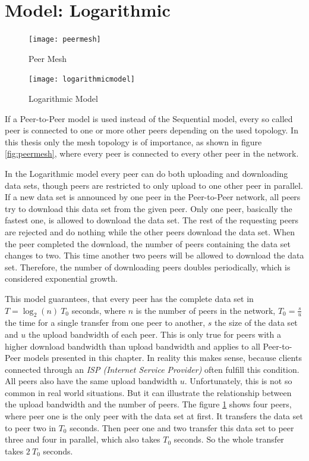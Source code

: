 \section{Model: Logarithmic}
\label{theory:model:logarithmic}

\begin{figure} [ht]
	\centering
	\begin{minipage}[b]{0.4\linewidth}
		\texttt{[image: peermesh]}
		\caption{Peer Mesh}
		\label{fig:peermesh}
	\end{minipage}
	\hspace{0.1\linewidth}
	\begin{minipage}[b]{0.4\linewidth}
		\texttt{[image: logarithmicmodel]}
		\caption{Logarithmic Model}
		\label{fig:logarithmicmodel}
	\end{minipage}

\end{figure}


If a Peer-to-Peer model is used instead of the Sequential model, every so called peer is connected to one or more other peers depending on the used topology. In this thesis only the mesh topology is of importance, as shown in figure \ref{fig:peermesh}, where every peer is connected to every other peer in the network.

In the Logarithmic model every peer can do both uploading and downloading data sets, though peers are restricted to only upload to one other peer in parallel. If a new data set is announced by one peer in the Peer-to-Peer network, all peers try to download this data set from the given peer. Only one peer, basically the fastest one, is allowed to download the data set. The rest of the requesting peers are rejected and do nothing while the other peers download the data set. When the peer completed the download, the number of peers containing the data set changes to two. This time another two peers will be allowed to download the data set. Therefore, the number of downloading peers doubles periodically, which is considered exponential growth.

This model guarantees, that every peer has the complete data set in $T=\log_{2}{(n)}\:T_0$  seconds, where $n$ is the number of peers in the network, $T_0=\frac{s}{u}$ the time for a single transfer from one peer to another, $s$ the size of the data set and $u$ the upload bandwidth of each peer. This is only true for peers with a higher download bandwidth than upload bandwidth and applies to all Peer-to-Peer models presented in this chapter. In reality this makes sense, because clients connected through an \emph{ISP (Internet Service Provider)} often fulfill this condition. All peers also have the same upload bandwidth $u$. Unfortunately, this is not so common in real world situations. But it can illustrate the relationship between the upload bandwidth and the number of peers. The figure \ref{fig:logarithmicmodel} shows four peers, where peer one is the only peer with the data set at first. It transfers the data set to peer two in $T_0$ seconds. Then peer one and two transfer this data set to peer three and four in parallel, which also takes $T_0$ seconds. So the whole transfer takes $2\:T_0$ seconds.

